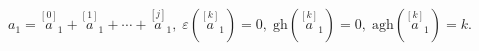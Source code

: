 \begin{equation}
a_{1}=\stackrel{[0]}{a}_{1}+\stackrel{[1]}{a}_{1}+\cdots +\stackrel{[j]}{a}%
_{1},\;\varepsilon \left( \stackrel{[k]}{a}_{1}\right) =0,\;\mathrm{gh}%
\left( \stackrel{[k]}{a}_{1}\right) =0,\;\mathrm{agh}\left( \stackrel{[k]}{a}%
_{1}\right) =k.  \label{bf58}
\end{equation}

